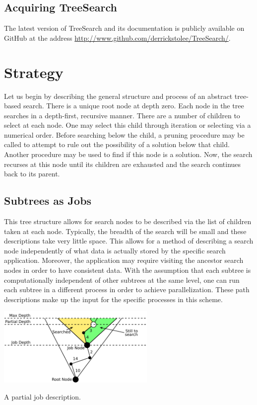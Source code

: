 \documentclass[11pt]{article}
\def\TreeSearch{{TreeSearch}}
\begin{document}
\subsection{Acquiring \TreeSearch}

The latest version of {\TreeSearch} and its documentation
	is publicly available on GitHub \cite{github} at the address
	\href{http://www.github.com/derrickstolee/TreeSearch/}{http://www.github.com/derrickstolee/TreeSearch/}.


\section{Strategy}
\label{sec:Strategy}

Let us begin by describing the general structure and process of an abstract
	tree-based search.
There is a unique root node at depth zero.
Each node in the tree searches in a depth-first, recursive manner.
There are a number of children to select at each node.
One may select this child through iteration or selecting via a numerical order.
Before searching below the child, a pruning procedure may be called to attempt to 
	rule out the possibility of a solution below that child.
Another procedure may be used to find if this node is a solution.
Now, the search recurses at this node until its children are exhausted 
	and the search continues back to its parent.

\subsection{Subtrees as Jobs}

This tree structure allows for search nodes to be described via the 
	list of children taken at each node.
Typically, the breadth of the search will be small and these descriptions take very little space.
This allows for a method of describing a search node independently of 
	what data is actually stored by the specific search application.
Moreover, the application may require visiting the ancestor search nodes in order
	to have consistent data.
With the assumption that each subtree is computationally independent of other subtrees at the same level,
	one can run each subtree in a different process in order to achieve parallelization.
These path descriptions make up the input for the specific processes in this scheme.

\begin{floatingfigure}{3in}\centering
	\includegraphics[width=3in]{figures/Jobs}
	\caption{\label{fig:jobs}A partial job description.}
\end{floatingfigure}
\end{document}
